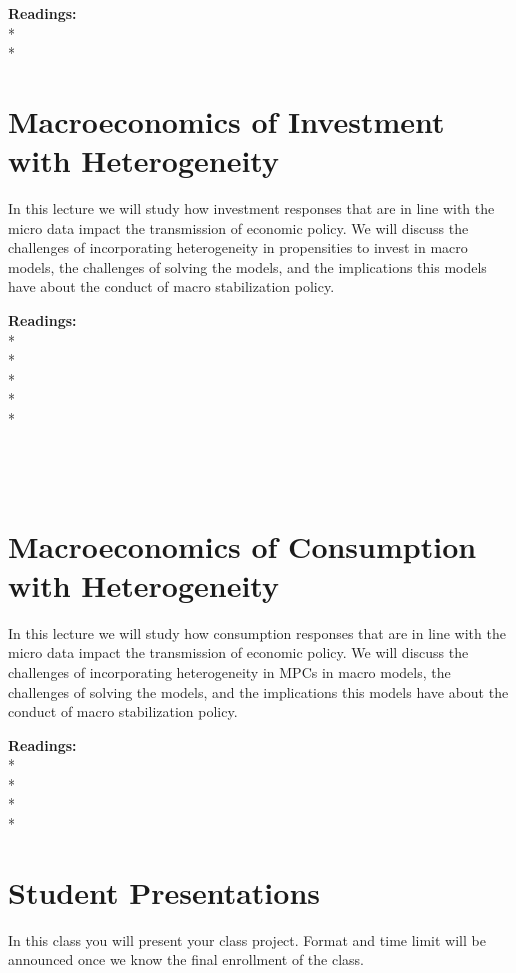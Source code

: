 \documentclass [12pt]{article}
\begin{document}
\noindent\textbf{Readings:}\\
*\\
*\\


\section{Macroeconomics of Investment with Heterogeneity}

In this lecture we will study how investment responses that are in line with the micro data impact the transmission of economic policy. We will discuss the challenges of incorporating heterogeneity in propensities to invest in macro models, the challenges of solving the models, and the implications this models have about the conduct of macro stabilization policy.

\noindent\textbf{Readings:}\\
* \\
* \\
* \\
* \\
*\\
\\
\\
 \\


\section{Macroeconomics of Consumption with Heterogeneity}

In this lecture we will study how consumption responses that are in line with the micro data impact the transmission of economic policy. We will discuss the challenges of incorporating heterogeneity in MPCs in macro models, the challenges of solving the models, and the implications this models have about the conduct of macro stabilization policy.

\noindent\textbf{Readings:}\\
* \\
* \\
* \\
* \\




\section{Student Presentations}

In this class you will present your class project. Format and time limit will be announced once we know the final enrollment of the class.
\end{document}
